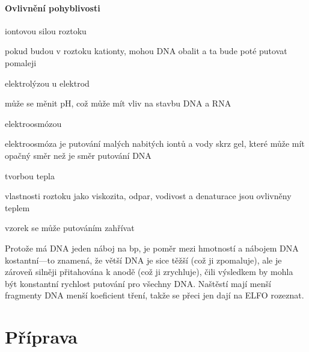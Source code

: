 \documentclass[DIV=8]{scrreprt}
\begin{document}
\paragraph{Ovlivnění pohyblivosti}
\begin{myItemize}[nosep]
    \item iontovou silou roztoku
\begin{myItemize}[nosep]
    \item pokud budou v roztoku kationty, mohou DNA obalit a ta bude poté putovat pomaleji
\end{myItemize}

    \item elektrolýzou u elektrod
\begin{myItemize}[nosep]
    \item může se měnit pH, což může mít vliv na stavbu DNA a RNA
\end{myItemize}

    \item elektroosmózou
\begin{myItemize}[nosep]
    \item elektroosmóza je putování malých nabitých iontů a vody skrz gel, které může mít opačný směr než je směr putování DNA
\end{myItemize}

    \item tvorbou tepla
\begin{myItemize}[nosep]
    \item vlastnosti roztoku jako viskozita, odpar, vodivost a denaturace jsou ovlivněny teplem
    \item vzorek se může putováním zahřívat
\end{myItemize}

\end{myItemize}



Protože má DNA jeden náboj na bp, je poměr mezi hmotností a nábojem DNA kostantní---to znamená, že větší DNA je sice těžší (což ji zpomaluje), ale je zároveň silněji přitahována k anodě (což ji zrychluje), čili výsledkem by mohla být konstantní rychlost putování pro všechny DNA. Naštěstí mají menší fragmenty DNA menší koeficient tření, takže se přeci jen dají na ELFO rozeznat.

\section{Příprava} \label{Příprava} \FloatBarrier
\end{document}
